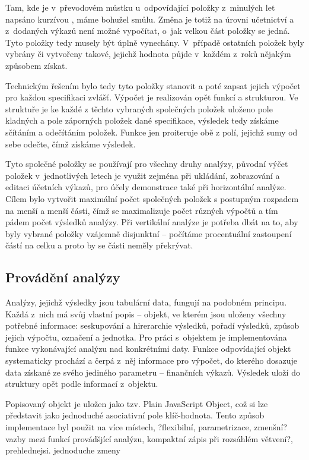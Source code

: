 Tam, kde je v~převodovém můstku u~odpovídající položky z~minulých let napsáno kurzívou , máme bohužel smůlu. Změna je totiž na úrovni učetnictví a z~dodaných výkazů není možné vypočítat, o~jak velkou část položky se jedná. Tyto položky tedy musely být úplně vynechány. V~případě ostatních položek byly vybrány či vytvořeny takové, jejichž hodnota půjde v~každém z~roků nějakým způsobem získat. 

Technickým řešením bylo tedy tyto položky stanovit a poté zapsat jejich výpočet pro každou specifikaci zvlášť. Výpočet je realizován opět funkcí a strukturou. Ve struktuře je ke každé z těchto vybraných společných položek uloženo pole kladných a pole záporných položek dané specifikace, výsledek tedy získáme sčítáním a odečítáním položek. Funkce jen proiteruje obě z polí, jejichž sumy od sebe odečte, čímž získáme výsledek.

Tyto společné položky se používají pro všechny druhy analýzy, původní výčet položek v~jednotlivých letech je využit zejména při ukládání, zobrazování a editaci účetních výkazů, pro účely demonstrace také při horizontální analýze. Cílem bylo vytvořit maximální počet společných položek s postupným rozpadem na menší a menší části, čímž se maximalizuje počet různých výpočtů a tím pádem počet výsledků analýzy. Při vertikální analýze je potřeba dbát na to, aby byly vybrané položky vzájemně disjunktní -- počítáme procentuální zastoupení částí na celku a proto by se části neměly překrývat.


\subsection{Provádění analýzy}
Analýzy, jejichž výsledky jsou tabulární data, fungují na podobném principu. Každá z~nich má svůj vlastní popis -- objekt, ve kterém jsou uloženy všechny potřebné informace: seskupování a hirerarchie výsledků, pořadí výsledků, způsob jejich výpočtu, označení a jednotka. Pro práci s~objektem je implementována funkce vykonávající analýzu nad konkrétními daty. Funkce odpovídající objekt systematicky prochází a čerpá z~něj informace pro výpočet, do kterého dosazuje data získané ze svého jediného parametru -- finančních výkazů. Výsledek uloží do struktury opět podle informací z~objektu.

Popisovaný objekt je uložen jako tzv. Plain JavaScript Object, což si lze představit jako jednoduché asociativní pole klíč-hodnota. Tento způsob implementace byl použit na více místech, ?flexibilní, parametrizace, zmenšní? vazby mezi funkcí provádšjící analýzu, kompaktní zápis při rozsáhlém větvení?, prehlednejsi. jednoduche zmeny

